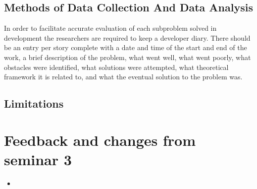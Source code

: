 \documentclass{sigchi}
\begin{document}
\subsection{Methods of Data Collection And Data Analysis}
In order to facilitate accurate evaluation of each subproblem solved in development the researchers are required to keep a developer diary. There should be an entry per story complete with a date and time of the start and end of the work, a brief description of the problem, what went well, what went poorly, what obstacles were identified, what solutions were attempted, what theoretical framework it is related to, and what the eventual solution to the problem was. 







\subsection{Limitations}

\balance{}




\newpage
\appendix{}
\section{Feedback and changes from seminar 3}


\begin{itemize}
\item 
\end{itemize}
\end{document}
